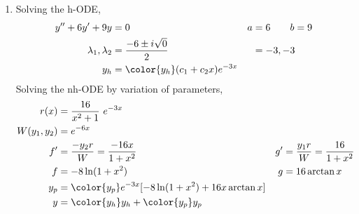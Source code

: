 \begin{enumerate}
    \item Solving the h-ODE,
          \begin{align}
              y'' + 6y' + 9y           & = 0                                     &
              a                        & = 6 \qquad b = 9                          \\
              \lambda_{1}, \lambda_{2} & = \frac{-6 \pm i\sqrt{0}}{2}            &
                                       & = -3, -3                                  \\
              y_{h}                    & = {\color{y_h} (c_{1} + c_{2}x)e^{-3x}}
          \end{align}
          Solving the nh-ODE by variation of parameters,
          \begin{align}
              r(x)            & = \frac{16}{x^{2} + 1}\ e^{-3x}                \\
              W(y_{1}, y_{2}) & = e^{-6x}                                      \\
              f'              & = \frac{-y_{2}r}{W} = \frac{-16x}{1 + x^{2}} &
              g'              & = \frac{y_{1}r}{W} = \frac{16}{1 + x^{2}}      \\
              f               & = -8\ln(1 + x^{2})                           &
              g               & = 16\arctan x                                  \\
              y_{p}           & = {\color{y_p} e^{-3x}[-8\ln(1 + x^{2})
              + 16x \arctan x]}                                                \\
              y               & = {\color{y_h} y_{h}} + {\color{y_p} y_{p}}
          \end{align}


\end{enumerate}

